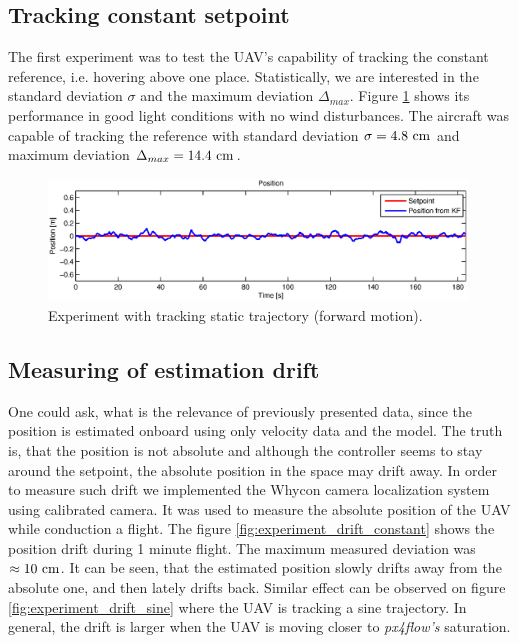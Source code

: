 \subsection{Tracking constant setpoint}

The first experiment was to test the UAV's capability of tracking the constant reference, i.e. hovering above one place. Statistically, we are interested in the standard deviation $\sigma$ and the maximum deviation $\Delta_{max}$. Figure \ref{fig:experiment_constant_trajectory} shows its performance in good light conditions with no wind disturbances. The aircraft was capable of tracking the reference with standard deviation $\sigma = 4.8~\mathrm{cm}$ and maximum deviation $\Delta_{max} = 14.4~\mathrm{cm}$.

\begin{figure}[H]
\centering
\includegraphics[width=0.99\textwidth]{fig/experiment6_constant_reference.eps}
\caption{Experiment with tracking static trajectory (forward motion).}
\label{fig:experiment_constant_trajectory}
\end{figure}

\subsection{Measuring of estimation drift}

One could ask, what is the relevance of previously presented data, since the position is estimated onboard using only velocity data and the model. The truth is, that the position is not absolute and although the controller seems to stay around the setpoint, the absolute position in the space may drift away. In order to measure such drift we implemented the Whycon camera localization system \citep{faigl2013whycon} using calibrated camera. It was used to measure the absolute position of the UAV while conduction a flight. The figure \ref{fig:experiment_drift_constant} shows the position drift during 1 minute flight. The maximum measured deviation was $\approx 10~\mathrm{cm}$. It can be seen, that the estimated position slowly drifts away from the absolute one, and then lately drifts back. Similar effect can be observed on figure \ref{fig:experiment_drift_sine} where the UAV is tracking a sine trajectory. In general, the drift is larger when the UAV is moving closer to \emph{px4flow's} saturation.

